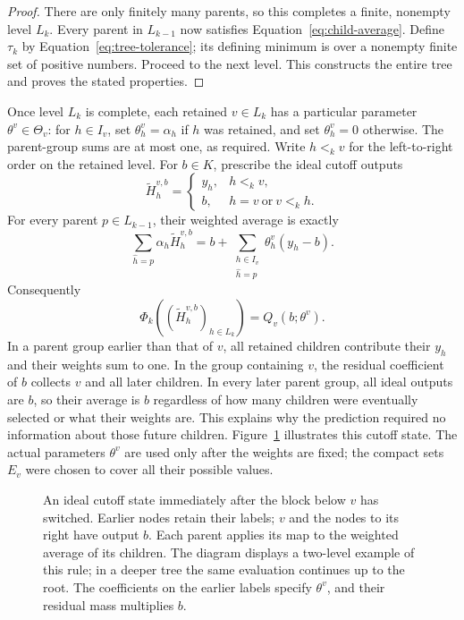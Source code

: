 \begin{proof}
There are only finitely many parents, so this completes a finite,
nonempty level $L_k$.  Every parent in $L_{k-1}$ now satisfies
Equation~\eqref{eq:child-average}.  Define $\tau_k$ by
Equation~\eqref{eq:tree-tolerance}; its defining minimum is over
a nonempty finite set of positive numbers.  Proceed to the next
level.  This constructs the entire tree and proves the stated
properties.
\end{proof}

Once level $L_k$ is complete, each retained $v\in L_k$ has a
particular parameter $\theta^v\in\Theta_v$: for $h\in I_v$, set
$\theta^v_h=\alpha_h$ if $h$ was retained, and set
$\theta^v_h=0$ otherwise.  The parent-group sums are at most one,
as required.  Write $h<_k v$ for the left-to-right order on
the retained level.  For $b\in K$, prescribe the ideal cutoff
outputs
\[
 \widetilde H_h^{v,b}=
 \begin{cases}
   y_h,&h<_k v,\\
   b,&h=v\ \text{or}\ v<_k h.
 \end{cases}
\]
For every parent $p\in L_{k-1}$, their weighted average is exactly
\[
 \sum_{\widehat h=p}\alpha_h\widetilde H_h^{v,b}
   =b+\sum_{\substack{h\in I_v\\\widehat h=p}}
                         \theta^v_h(y_h-b).
\]
Consequently
\begin{equation}
 \Phi_k((\widetilde H_h^{v,b})_{h\in L_k})
       =Q_v(b;\theta^v).
 \label{eq:prediction-cutoff}
\end{equation}
In a parent group earlier than that of $v$, all retained children
contribute their $y_h$ and their weights sum to one.  In the group
containing $v$, the residual coefficient of $b$ collects $v$ and
all later children.  In every later parent group, all ideal outputs
are $b$, so their average is $b$ regardless of how many children
were eventually selected or what their weights are.  This explains
why the prediction required no information about those future
children. Figure~\ref{fig:cutoff} illustrates this cutoff state.
The actual parameters $\theta^v$ are used only after
the weights are fixed; the compact sets $E_v$ were chosen to cover
all their possible values.


\begin{figure}[t]
\centering

\caption{An ideal cutoff state immediately after the block below $v$
has switched. Earlier nodes retain their labels; $v$ and the nodes to
its right have output $b$. Each parent applies its map to the weighted
average of its children. The diagram displays a two-level example of
this rule; in a deeper tree the same evaluation continues up to the root.
The coefficients on the earlier labels specify $\theta^v$, and their
residual mass multiplies $b$.}
\label{fig:cutoff}
\end{figure}
